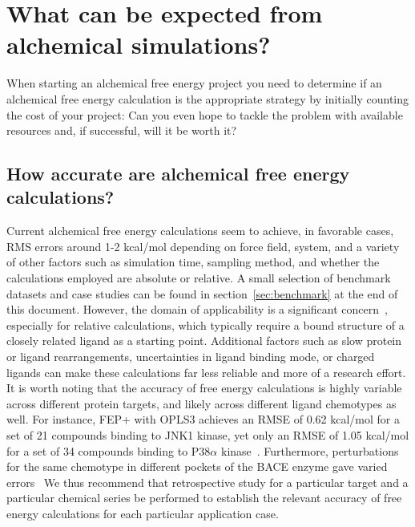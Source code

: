 \documentclass[9pt,bestpractices]{livecoms}
\begin{document}
\section{What can be expected from alchemical simulations?}
\label{sec:step0}
When starting an alchemical free energy project you need to determine if an alchemical free energy calculation is the appropriate strategy by initially counting the cost of your
project: Can you even hope to tackle the problem with available resources and, if successful, will it
be worth it?
\subsection{How accurate are alchemical free energy calculations?}
\label{subsec:accuracy}
%
Current alchemical free energy calculations seem to achieve, in favorable cases, RMS errors around 1-2 kcal/mol depending on force field, system, and a variety of other factors such as simulation time, sampling method, and whether the calculations employed are absolute or relative. A small selection of benchmark datasets and case studies can be found in section~\ref{sec:benchmark} at the end of this document.
However, the domain of applicability is a significant concern~\cite{sherborne2016collaborating, cournia2017relative}, especially for relative calculations, which typically require a bound structure of a closely
related ligand as a starting point. Additional factors such as slow protein or ligand rearrangements, uncertainties in ligand binding mode, or charged ligands can make these calculations far less reliable and more of a research effort.
%
It is worth noting that the accuracy of free energy calculations is highly variable across different protein targets, and likely across different ligand chemotypes as well. For instance, FEP+ with OPLS3 achieves an RMSE of 0.62 kcal/mol for a set of 21 compounds binding to JNK1 kinase, yet only an RMSE of 1.05 kcal/mol for a set of 34 compounds binding to P38$\alpha$ kinase~\cite{harder2016opls3}. Furthermore, perturbations for the same chemotype in different pockets of the BACE enzyme gave varied errors~\cite{keranen2017acylguanidine}
We thus recommend that retrospective study for a particular target and a particular chemical series be performed to establish the relevant accuracy of free energy calculations for each particular application case.
%
\end{document}
